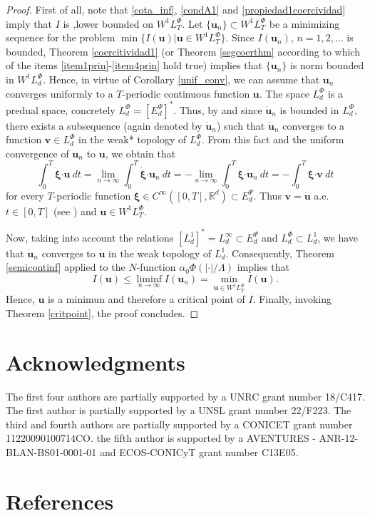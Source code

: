 \documentclass[twoside]{elsarticle}
\theoremstyle{remark}
\newcommand{\lphi}{L^{\Phi}}
\newcommand{\wphi}{W^{1}\lphi}
\renewcommand{\b}[1]{\boldsymbol{#1}}
\newcommand{\rr}{\mathbb{R}}
\newcommand{\ccdot}{\b{\cdot}}
\renewcommand{\leq}{\leqslant}
\newcommand{\epsi}{E^{\Psi}}
\begin{document}
\begin{proof} First of all, note that  \eqref{cota_inf}, \eqref{condA1} and \eqref{propiedad1coercividad} imply that $I$ is ,lower bounded on $\wphi_T$. Let $\{\b{u}_n\}\subset \wphi_T$ be a  minimizing sequence for the problem  $\min\{I(\b{u})|\b{u}\in\wphi_T\}$.
Since  $I(\b{u}_n)$, $n=1,2,\ldots$  is bounded, Theorem \ref{coercitividad1} (or Theorem \ref{segcoerthm} according to which of the items \ref{item1prin}-\ref{item4prin} hold true) implies that $\{\b{u}_n\}$ is norm bounded in $\wphi_d$. Hence, in virtue of Corollary \ref{unif_conv}, we can assume that $\b{u}_n$ converges uniformly to a $T$-periodic continuous function $\b{u}$.  The space  $\lphi_d$ is a predual space, concretely $\lphi_d=\left[\epsi_d\right]^*$. Thus, by \cite[Cor. 5, p. 148]{rao1991theory} and since $\b{\dot{u}}_n$ is bounded in $\lphi_d$,  there exists a subsequence (again denoted by $\b{\dot{u}}_n$) such that $\b{\dot{u}}_n$ converges to a function $\b{v}\in\lphi_d$ in the weak* topology of $\lphi_d$. From this fact and the uniform convergence of $\b{u}_n$ to $\b{u}$, we obtain that
\[
\int_0^T\b{\dot{\xi}}\ccdot\b{u}\ dt=\lim_{n\to\infty}\int_0^T\b{\dot{\xi}}\ccdot\b{u}_n \ dt=-\lim_{n\to\infty}\int_0^T\b{\xi}\ccdot\b{\dot{u}}_n\ dt=-\int_0^T\b{\xi}\ccdot\b{v}\ dt
\]
for every $T$-periodic function $\b{\xi}\in C^{\infty}([0,T],\rr^d)\subset\epsi_d$.
Thus $\b{v}=\b{\dot{u}}$ a.e. $t\in [0,T]$ (see \cite[p. 6]{mawhin2010critical}) and $\b{u}\in\wphi_T$.

Now, taking into account the relations $\left[L^1_d\right]^*=L^{\infty}_d\subset  \epsi_d$ and $\lphi_d\subset L^1_d$, we have that $\b{\dot{u}}_n$ converges to $\b{\dot{u}}$ in the weak topology of $L^1_d$. Consequently,  Theorem \ref{semicontinf} applied to the $N$-function $\alpha_0\Phi\left(|\ccdot|/\Lambda\right)$ implies that
\[I(\b{u})\leq  \liminf_{n\to\infty}I(\b{u}_n)=\min\limits_{\b{u}\in\wphi_T}I(\b{u}).\]
Hence, $\b{u}$ is a minimun and therefore a critical point of $I$. Finally, 
invoking Theorem \ref{critpoint},  the proof concludes.\end{proof}

\section*{Acknowledgments}
The first four authors are partially supported by a UNRC grant number 18/C417. The first author is  partially supported by a  UNSL grant number 22/F223. The third and fourth authors are partially supported by a CONICET grant number 11220090100714CO. the fifth  author is  supported by a AVENTURES - ANR-12-BLAN-BS01-0001-01 and ECOS-CONICyT grant number  C13E05.


\section*{References}

  
 
\end{document}

